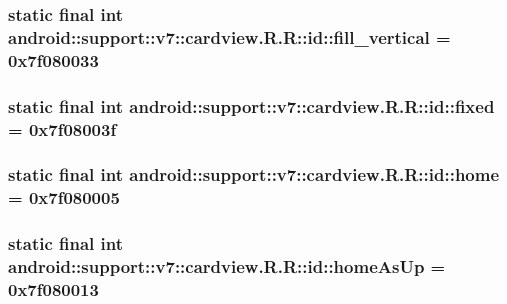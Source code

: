 \hypertarget{classandroid_1_1support_1_1v7_1_1cardview_1_1_r_1_1id_be1b085bac5b655dfee2ac858c75d21e}{
\subsubsection[{fill\_\-vertical}]{\setlength{\rightskip}{0pt plus 5cm}static final int android::support::v7::cardview.R.R::id::fill\_\-vertical = 0x7f080033}}
\label{classandroid_1_1support_1_1v7_1_1cardview_1_1_r_1_1id_be1b085bac5b655dfee2ac858c75d21e}


\hypertarget{classandroid_1_1support_1_1v7_1_1cardview_1_1_r_1_1id_3379de06f8ad43d18fbafb8b6b0c9a31}{
\subsubsection[{fixed}]{\setlength{\rightskip}{0pt plus 5cm}static final int android::support::v7::cardview.R.R::id::fixed = 0x7f08003f}}
\label{classandroid_1_1support_1_1v7_1_1cardview_1_1_r_1_1id_3379de06f8ad43d18fbafb8b6b0c9a31}


\hypertarget{classandroid_1_1support_1_1v7_1_1cardview_1_1_r_1_1id_bff4adabd3a817c4e89c58c5f30897dc}{
\subsubsection[{home}]{\setlength{\rightskip}{0pt plus 5cm}static final int android::support::v7::cardview.R.R::id::home = 0x7f080005}}
\label{classandroid_1_1support_1_1v7_1_1cardview_1_1_r_1_1id_bff4adabd3a817c4e89c58c5f30897dc}


\hypertarget{classandroid_1_1support_1_1v7_1_1cardview_1_1_r_1_1id_30292988e65bac5fd334536566bbc450}{
\subsubsection[{homeAsUp}]{\setlength{\rightskip}{0pt plus 5cm}static final int android::support::v7::cardview.R.R::id::homeAsUp = 0x7f080013}}
\label{classandroid_1_1support_1_1v7_1_1cardview_1_1_r_1_1id_30292988e65bac5fd334536566bbc450}


